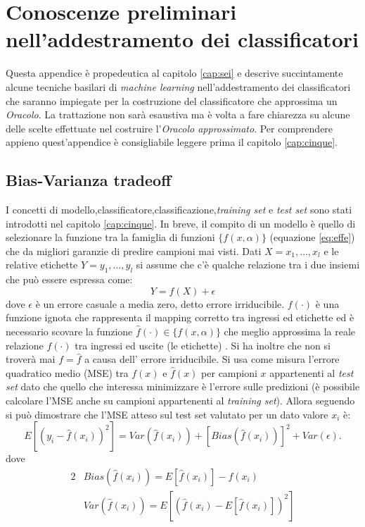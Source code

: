 \chapter[Prel. add.  class.]{Conoscenze preliminari nell'addestramento dei classificatori}
\label{app:due}
Questa appendice è propedeutica al capitolo \ref{cap:sei} e descrive succintamente alcune tecniche basilari di \textit{machine learning}  nell'addestramento dei classificatori che saranno impiegate per la costruzione del classificatore che approssima un \textit{Oracolo}. La trattazione non sarà esaustiva ma è volta a fare chiarezza su alcune delle scelte effettuate nel costruire l'\textit{Oracolo approssimato}. Per comprendere appieno quest'appendice è consigliabile leggere prima il capitolo \ref{cap:cinque}.

\section{Bias-Varianza tradeoff}
I concetti di modello,classificatore,classificazione,\textit{training set} e \textit{test set} sono stati introdotti nel capitolo \ref{cap:cinque}. In breve,  il compito di un modello è quello di selezionare la funzione tra la famiglia di funzioni $\{f(x,\alpha)\}$ (equazione \eqref{eq:effe}) che da migliori garanzie di predire campioni mai visti. Dati $X=x_1,\dots,x_l$ e le relative etichette $Y=y_1,\dots,y_l$ si assume che c'è qualche relazione tra i due insiemi che può essere espressa come:
\begin{equation}
Y = f(X) + \epsilon
\end{equation}
dove $\epsilon$ è un errore casuale a media zero, detto errore irriducibile.
$f(\cdot)$ è una funzione ignota che rappresenta il mapping corretto tra ingressi ed etichette ed è necessario scovare la funzione $\hat{f}(\cdot) \in \{f(x,\alpha)\}$ che meglio approssima la reale relazione $f(\cdot)$ tra ingressi ed uscite (le etichette) . Si ha inoltre che non si troverà mai $f=\hat{f}$ a causa dell' errore irriducibile. Si usa come misura l'errore quadratico medio (MSE) tra $f(x) \text{ e }\hat{f}(x)$ per campioni $x$ appartenenti al \textit{test set} dato che quello che interessa minimizzare è l'errore sulle predizioni (è possibile calcolare l'MSE anche su campioni appartenenti al \textit{training set}). Allora seguendo \cite{Trevor09} si può dimostrare che l'MSE atteso sul test set valutato per un dato valore $x_i$ è:
\begin{equation}
E[( y_i − \hat{f}(x_i) )^2] = Var( \hat{f}(x_i)) + [Bias( \hat{f}(x_i))]^2 + Var(\epsilon). 
\end{equation}  
 dove 
 \begin{alignat*}{2}
&Bias( \hat{f}(x_i)) = E[\hat{f}(x_i)] - f(x_i) \\
 &Var( \hat{f}(x_i)) = E[(\hat{f}(x_i) - E[\hat{f}(x_i)])^2]
\end{alignat*}

